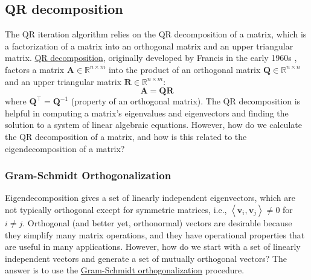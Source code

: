\documentclass{article}[11pt]
\begin{document}
\subsection{QR decomposition}
The QR iteration algorithm relies on the QR decomposition of a matrix, which is a factorization of a matrix into an orthogonal matrix and an upper triangular matrix.
\href{https://en.wikipedia.org/wiki/QR_decomposition}{QR decomposition}, originally developed by Francis in the early 1960s \cite{Francis-QR-1961, Francis-QR-1962}, factors a matrix $\mathbf{A}\in\mathbb{R}^{n\times{m}}$ 
into the product of an orthogonal matrix $\mathbf{Q}\in\mathbb{R}^{n\times{n}}$ and 
an upper triangular matrix $\mathbf{R}\in\mathbb{R}^{n\times{m}}$:
\begin{equation}
\mathbf{A} = \mathbf{Q}\mathbf{R}
\end{equation}
where $\mathbf{Q}^{\top} = \mathbf{Q}^{-1}$ (property of an orthogonal matrix). 
The QR decomposition is helpful in computing a matrix's eigenvalues and eigenvectors and finding the solution to a system of linear algebraic equations. However, how do we calculate the QR decomposition of a matrix, and how is this related to the eigendecomposition of a matrix?

\subsubsection*{Gram-Schmidt Orthogonalization}
Eigendecomposition gives a set of linearly independent eigenvectors, which are not typically orthogonal except for symmetric matrices, i.e., $\left<\mathbf{v}_{i},\mathbf{v}_{j}\right>\neq{0}$ for $i\neq{j}$.
Orthogonal (and better yet, orthonormal) vectors are desirable because they simplify many matrix operations, 
and they have operational properties that are useful in many applications. 
However, how do we start with a set of linearly independent vectors and generate a set of mutually orthogonal vectors?
The answer is to use the \href{https://en.wikipedia.org/wiki/Gram-Schmidt_process}{Gram-Schmidt orthogonalization} procedure. 
\end{document}

